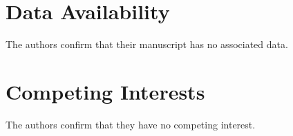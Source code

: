 \documentclass[12pt,reqno]{amsart}
\begin{document}

\section{Data Availability} 	
The authors confirm that their manuscript has no associated data.

\section{Competing Interests}
The authors confirm that they have no competing interest. 
\end{document}
